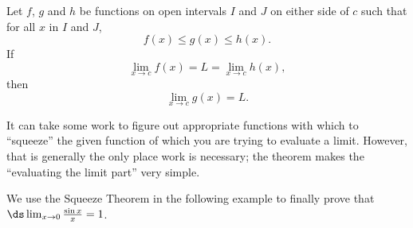 \begin{theorem}\label{thm:sqz}
Let $f$, $g$ and $h$ be functions on open intervals $I$ and $J$ on either side of $c$ such that for all $x$ in $I$ and $J$,\vspace{-.3\baselineskip}
\[f(x)\leq g(x) \leq h(x).\]
If\vspace{-.4\baselineskip}
\[\lim_{x\to c} f(x) = L = \lim_{x\to c} h(x),\]
then\vspace{-.4\baselineskip}
\[\lim_{x\to c} g(x) = L.\]
\end{theorem}


It can take some work to figure out appropriate functions with which to ``squeeze'' the given function of which you are trying to evaluate a limit. However, that is generally the only place work is necessary; the theorem makes the ``evaluating the limit part'' very simple. 

We use the Squeeze Theorem in the following example to finally prove that $\ds \lim_{x\to 0} \frac{\sin x}{x} = 1$.

